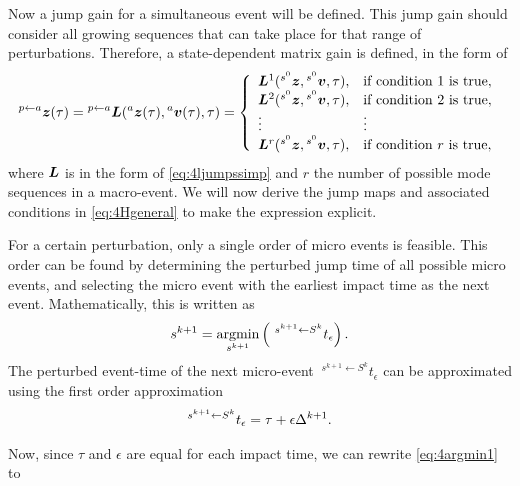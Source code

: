 \documentclass[../DC2017114Bouma.tex]{subfiles}
\begin{document}
Now a jump gain for a simultaneous event will be defined. This jump gain should consider all growing sequences that can take place for that range of perturbations. Therefore, a state-dependent matrix gain is defined, in the form of
\begin{align}
\hspace{0cm}^{p \leftarrow a}{\boldsymbol{z}}(\tau)= \hspace{0cm}^{p \leftarrow a}{\boldsymbol{L}}(\hspace{0cm}^{a}{\boldsymbol{z}}(\tau),\hspace{0cm}^{a}{\boldsymbol{v}}(\tau),\tau) = \left\lbrace\begin{array}{ll}
{\boldsymbol{L}}^1(\hspace{0cm}^{s^0}{\boldsymbol{z}},\hspace{0cm}^{s^0}{\boldsymbol{v}},\tau), & \text{if condition 1 is true},\\
{\boldsymbol{L}}^2(\hspace{0cm}^{s^0}{\boldsymbol{z}},\hspace{0cm}^{s^0}{\boldsymbol{v}},\tau), & \text{if condition 2 is true},\\
\vdots & \vdots\\
{\boldsymbol{L}}^{r}(\hspace{0cm}^{s^0}{\boldsymbol{z}},\hspace{0cm}^{s^0}{\boldsymbol{v}},\tau), & \text{if condition }r\text{ is true},
\end{array}\right.\label{eq:4Hgeneral}
\end{align}
where ${\boldsymbol{L}}$ is in the form of \eqref{eq:4ljumpssimp} and $r$ the number of possible mode sequences in a macro-event. We will now derive the jump maps and associated conditions in \eqref{eq:4Hgeneral} to make the expression explicit.

For a certain perturbation, only a single order of micro events is feasible. This order can be found by determining the perturbed jump time of all possible micro events, and selecting the micro event with the earliest impact time as the next event. Mathematically, this is written as
\begin{align}
s^{k+1} = \underset{s^{k+1}}{\operatorname{\text{argmin}}}\left(\ ^{s^{k+1} \leftarrow S^{k}}t_\epsilon\right).\label{eq:4argmin1}
\end{align}
The perturbed event-time of the next micro-event $\ ^{s^{k+1} \leftarrow S^{k}}t_\epsilon$ can be approximated using the first order approximation
\begin{align}
\hspace{0cm}^{s^{k+1} \leftarrow S^{k}}t_\epsilon = \tau + \epsilon\Delta^{k+1}.
\end{align}

Now, since $\tau$ and $\epsilon$ are equal for each impact time, we can rewrite \eqref{eq:4argmin1} to
\end{document}
